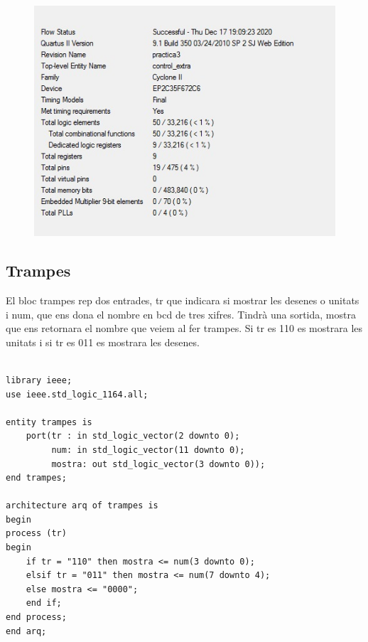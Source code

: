 \documentclass[12pt, a4papre]{article}
\begin{document}
	\begin{figure}[H]
			
		\begin{center}
		\includegraphics[width=130mm]{informeControlExtra.jpeg}
		\end{center}
	\end{figure}	
			
\subsection{Trampes}

	El bloc trampes rep dos entrades, tr que indicara si mostrar les desenes o unitats i num, que ens dona el nombre en bcd de tres xifres. Tindrà una sortida, mostra que ens retornara el nombre que veiem al fer trampes. Si tr es 110 es mostrara les unitats i si tr es 011 es mostrara les desenes.
	
	\begin{lstlisting}[style=vhdl, frame=single, basicstyle=\tiny]

library ieee;
use ieee.std_logic_1164.all;

entity trampes is
	port(tr : in std_logic_vector(2 downto 0);
		 num: in std_logic_vector(11 downto 0);
		 mostra: out std_logic_vector(3 downto 0));
end trampes;

architecture arq of trampes is
begin
process (tr)
begin
	if tr = "110" then mostra <= num(3 downto 0);
	elsif tr = "011" then mostra <= num(7 downto 4);
	else mostra <= "0000";
	end if;
end process;
end arq;

			\end{lstlisting}
			
\end{document}
